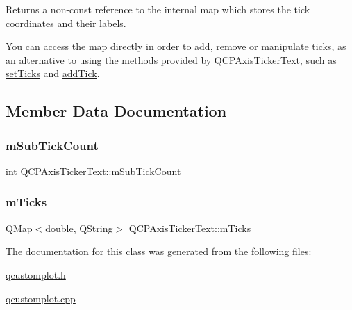 Returns a non-\/const reference to the internal map which stores the tick coordinates and their labels.

You can access the map directly in order to add, remove or manipulate ticks, as an alternative to using the methods provided by \hyperlink{class_q_c_p_axis_ticker_text}{Q\+C\+P\+Axis\+Ticker\+Text}, such as \hyperlink{class_q_c_p_axis_ticker_text_a8cdf1f21940f1f53f5e3d30b2c74f5cf}{set\+Ticks} and \hyperlink{class_q_c_p_axis_ticker_text_aada3db69e5fc6585aaa4ea5d89552eb0}{add\+Tick}. 

\subsection{Member Data Documentation}
\mbox{\label{class_q_c_p_axis_ticker_text_a206d092b1598eecb981bba7fb16ff44e}} 
\subsubsection{\texorpdfstring{m\+Sub\+Tick\+Count}{mSubTickCount}}
{\footnotesize\ttfamily int Q\+C\+P\+Axis\+Ticker\+Text\+::m\+Sub\+Tick\+Count\hspace{0.3cm}{\ttfamily [protected]}}

\mbox{\label{class_q_c_p_axis_ticker_text_a27c48539feb6c293979cd8059ba220c3}} 
\subsubsection{\texorpdfstring{m\+Ticks}{mTicks}}
{\footnotesize\ttfamily Q\+Map$<$double, Q\+String$>$ Q\+C\+P\+Axis\+Ticker\+Text\+::m\+Ticks\hspace{0.3cm}{\ttfamily [protected]}}



The documentation for this class was generated from the following files\+:\begin{DoxyCompactItemize}
\item 
\hyperlink{qcustomplot_8h}{qcustomplot.\+h}\item 
\hyperlink{qcustomplot_8cpp}{qcustomplot.\+cpp}\end{DoxyCompactItemize}
